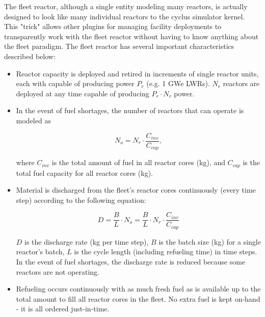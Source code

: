 \documentclass{style}
\begin{document}
The fleet reactor, although a single entity modeling many reactors, is
actually designed to look like many individual reactors to the cyclus
simulator kernel. This "trick" allows other plugins for managing facility
deployments to transparently work with the fleet reactor without having to
know anything about the fleet paradigm.  The fleet reactor has several
important characteristics described below:

\begin{itemize}

    \item Reactor capacity is deployed and retired in increments of single
      reactor units, each with capable of producing power $P_r$ (e.g. 1 GWe
      LWRs).  $N_{r}$ reactors are deployed at any time capable of producing
      $P_r \cdot N_r$ power.

    \item In the event of fuel shortages, the number of reactors that can
      operate is modeled as

      \begin{equation}
        N_{o} = N_{r} \cdot \frac{C_{inv}}{C_{cap}},
        \label{eqn:operating-reactors}
      \end{equation}

       where $C_{inv}$ is the total amount of fuel in all reactor cores (kg),
       and $C_{cap}$ is the total fuel capacity for all reactor cores (kg).

    \item Material is discharged from the fleet's reactor cores continuously
        (every time step) according to the following equation:

        \begin{equation}
            D =
            \frac{B}{L} \cdot N_{o} =  \frac{B}{L} \cdot N_{r}\cdot \frac{C_{inv}}{C_{cap}}
            \label{eqn:fleet-discharge}
        \end{equation}

        $D$ is the discharge rate (kg per time step), $B$ is the batch size
        (kg) for a single reactor's batch, $L$ is the cycle length (including
        refueling time) in time steps.  In the event of fuel shortages, the
        discharge rate is reduced because some reactors are not operating.

    \item Refueling occurs continuously with as much fresh fuel as is
        available up to the total amount to fill all reactor cores in the
        fleet.  No extra fuel is kept on-hand - it is all ordered
        just-in-time.


\end{itemize}
\end{document}
